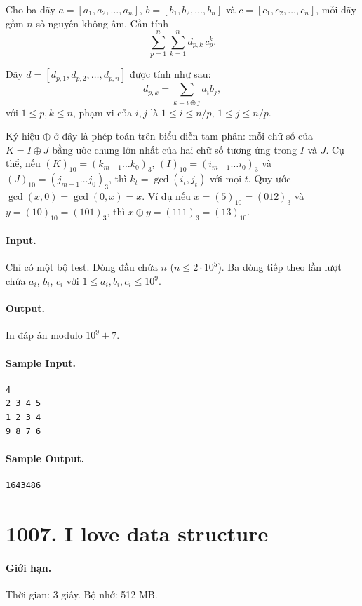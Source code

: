 \documentclass[11pt]{article}
\begin{document}
Cho ba dãy
$a=[a_1,a_2,\ldots,a_n]$, $b=[b_1,b_2,\ldots,b_n]$ và
$c=[c_1,c_2,\ldots,c_n]$, mỗi dãy gồm $n$ số nguyên không âm.  Cần tính
\[
  \sum_{p=1}^{n}\sum_{k=1}^{n} d_{p,k}\,c_p^k.
\]

Dãy $d=[d_{p,1},d_{p,2},\ldots,d_{p,n}]$ được tính như sau:
\[
  d_{p,k}=\sum_{k=i\oplus j} a_i b_j,
\]
với $1\le p,k\le n$, phạm vi của $i,j$ là
$1\le i\le n/p$, $1\le j\le n/p$.

Ký hiệu $\oplus$ ở đây là phép toán trên biểu diễn tam phân: mỗi chữ số của
$K=I\oplus J$ bằng ước chung lớn nhất của hai chữ số tương ứng trong $I$ và
$J$.  Cụ thể, nếu
$(K)_{10}=(k_{m-1}\ldots k_0)_3$,
$(I)_{10}=(i_{m-1}\ldots i_0)_3$ và
$(J)_{10}=(j_{m-1}\ldots j_0)_3$, thì
$k_t=\gcd(i_t,j_t)$ với mọi $t$.  Quy ước
$\gcd(x,0)=\gcd(0,x)=x$.  Ví dụ nếu
$x=(5)_{10}=(012)_3$ và $y=(10)_{10}=(101)_3$, thì
$x\oplus y=(111)_3=(13)_{10}$.

\paragraph{Input.}
Chỉ có một bộ test.  Dòng đầu chứa $n$ ($n\le 2\cdot 10^5$).  Ba dòng tiếp
theo lần lượt chứa $a_i$, $b_i$, $c_i$ với $1\le a_i,b_i,c_i\le 10^9$.

\paragraph{Output.}
In đáp án modulo $10^9+7$.

\paragraph{Sample Input.}
\begin{verbatim}
4
2 3 4 5
1 2 3 4
9 8 7 6
\end{verbatim}

\paragraph{Sample Output.}
\begin{verbatim}
1643486
\end{verbatim}

\section{1007. I love data structure}

\paragraph{Giới hạn.} Thời gian: 3 giây. Bộ nhớ: 512 MB.
\end{document}
